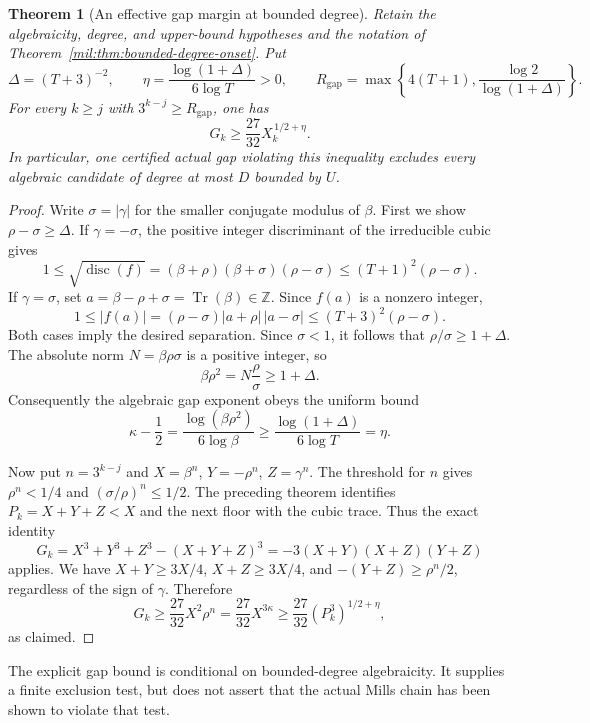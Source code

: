\documentclass[11pt,a4paper]{article}
\newtheorem{theorem}{Theorem}[section]
\theoremstyle{definition}
\theoremstyle{remark}
\numberwithin{equation}{section}
\begin{document}
\begin{theorem}[An effective gap margin at bounded degree]\label{mil:thm:bounded-degree-gap}
Retain the algebraicity, degree, and upper-bound hypotheses and the
notation of Theorem~\ref{mil:thm:bounded-degree-onset}. Put
\[
 \Delta=(T+3)^{-2},\qquad
 \eta=\frac{\log(1+\Delta)}{6\log T}>0,
 \qquad R_{\mathrm{gap}}=
 \max\left\{4(T+1),\frac{\log2}{\log(1+\Delta)}\right\}.
\]
For every $k\geq j$ with $3^{k-j}\geq R_{\mathrm{gap}}$, one has
\[
 \boxed{G_k\geq\frac{27}{32}X_k^{\,1/2+\eta}.}
\]
In particular, one certified actual gap violating this inequality
excludes every algebraic candidate of degree at most $D$ bounded by
$U$.
\end{theorem}

\begin{proof}
Write $\sigma=|\gamma|$ for the smaller conjugate modulus of $\beta$.
First we show $\rho-\sigma\geq\Delta$. If $\gamma=-\sigma$, the
positive integer discriminant of the irreducible cubic gives
\[
 1\leq\sqrt{\operatorname{disc}(f)}
   =(\beta+\rho)(\beta+\sigma)(\rho-\sigma)
   \leq(T+1)^2(\rho-\sigma).
\]
If $\gamma=\sigma$, set $a=\beta-\rho+\sigma=\operatorname{Tr}(\beta)
\in\mathbb Z$. Since $f(a)$ is a nonzero integer,
\[
 1\leq|f(a)|
   =(\rho-\sigma)|a+\rho|\,|a-\sigma|
   \leq(T+3)^2(\rho-\sigma).
\]
Both cases imply the desired separation. Since $\sigma<1$, it follows
that $\rho/\sigma\geq1+\Delta$. The absolute norm
$N=\beta\rho\sigma$ is a positive integer, so
\[
 \beta\rho^2=N\frac{\rho}{\sigma}\geq1+\Delta.
\]
Consequently the algebraic gap exponent obeys the uniform bound
\[
 \kappa-\frac12
 =\frac{\log(\beta\rho^2)}{6\log\beta}
 \geq\frac{\log(1+\Delta)}{6\log T}=\eta.
\]

Now put $n=3^{k-j}$ and
$X=\beta^n$, $Y=-\rho^n$, $Z=\gamma^n$. The threshold for $n$ gives
$\rho^n<1/4$ and $(\sigma/\rho)^n\leq1/2$. The preceding theorem
identifies $P_k=X+Y+Z<X$ and the next floor with the cubic trace.
Thus the exact identity
\[
 G_k=X^3+Y^3+Z^3-(X+Y+Z)^3
     =-3(X+Y)(X+Z)(Y+Z)
\]
applies. We have $X+Y\geq3X/4$, $X+Z\geq3X/4$, and
$-(Y+Z)\geq\rho^n/2$, regardless of the sign of $\gamma$.
Therefore
\[
 G_k\geq\frac{27}{32}X^2\rho^n
       =\frac{27}{32}X^{3\kappa}
       \geq\frac{27}{32}(P_k^3)^{1/2+\eta},
\]
as claimed.
\end{proof}

The explicit gap bound is conditional on bounded-degree algebraicity.
It supplies a finite exclusion test, but does not assert that the
actual Mills chain has been shown to violate that test.
\end{document}
